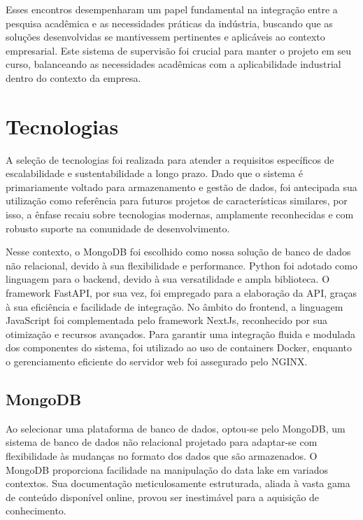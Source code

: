 Esses encontros desempenharam um papel fundamental na integração entre a pesquisa acadêmica e as necessidades práticas da indústria, buscando que as soluções desenvolvidas se mantivessem pertinentes e aplicáveis ao contexto empresarial. Este sistema de supervisão foi crucial para manter o projeto em seu curso, balanceando as necessidades acadêmicas com a aplicabilidade industrial dentro do contexto da empresa.


\section[Tecnologias]{Tecnologias}
A seleção de tecnologias foi realizada para atender a requisitos específicos de escalabilidade e sustentabilidade a longo prazo. Dado que o sistema é primariamente voltado para armazenamento e gestão de dados, foi antecipada sua utilização como referência para futuros projetos de características similares, por isso, a ênfase recaiu sobre tecnologias modernas, amplamente reconhecidas e com robusto suporte na comunidade de desenvolvimento.

Nesse contexto, o MongoDB foi escolhido como nossa solução de banco de dados não relacional, devido à sua flexibilidade e performance. Python foi adotado como linguagem para o backend, devido à sua versatilidade e ampla biblioteca. O framework FastAPI, por sua vez, foi empregado para a elaboração da \gls{API}, graças à sua eficiência e facilidade de integração. No âmbito do frontend, a linguagem JavaScript foi complementada pelo framework NextJs, reconhecido por sua otimização e recursos avançados. Para garantir uma integração fluida e modulada dos componentes do sistema, foi utilizado ao uso de containers Docker, enquanto o gerenciamento eficiente do servidor web foi assegurado pelo NGINX.

\subsection{MongoDB}
Ao selecionar uma plataforma de banco de dados, optou-se pelo MongoDB, um sistema de banco de dados não relacional projetado para adaptar-se com flexibilidade às mudanças no formato dos dados que são armazenados. O MongoDB proporciona facilidade na manipulação do data lake em variados contextos. Sua documentação meticulosamente estruturada, aliada à vasta gama de conteúdo disponível online, provou ser inestimável para a aquisição de conhecimento.

